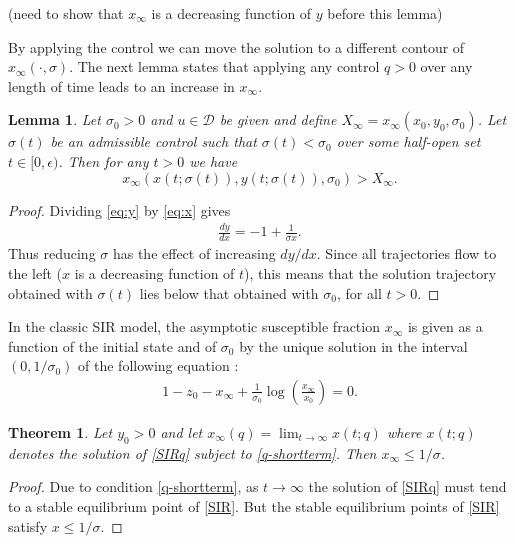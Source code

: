 \documentclass[english,12pt]{article}
\newtheorem{thm}{Theorem}
\newtheorem{lem}{Lemma}
\newtheorem{cor}{Corollary}
\newcommand{\Rnot}{\sigma_0}
\newcommand{\Sinf}{x_\infty}
\newcommand{\dom}{{\mathcal D}}
\begin{document}
(need to show that $\Sinf$ is a decreasing function of $y$ before this lemma)

By applying the control we can move the solution to a different contour of
$x_\infty(\cdot,\sigma)$.  The next lemma states that applying any control $q>0$ over
any length of time leads to an increase in $x_\infty$.
\begin{lem}
Let $\Rnot>0$ and $u\in\dom$ be given and define $X_\infty = x_\infty(x_0,y_0,\Rnot)$.
Let $\sigma(t)$ be an admissible control such that $\sigma(t)<\sigma_0$ over some
half-open set $t\in[0,\epsilon)$.  Then for any $t>0$ we have
$$
    x_\infty(x(t;\sigma(t)),y(t;\sigma(t)),\Rnot) > X_\infty.
$$
\end{lem}
\begin{proof}
    Dividing \eqref{eq:y} by \eqref{eq:x} gives
    \begin{align} \label{eq:dydx}
        \frac{dy}{dx} = -1 + \frac{1}{\sigma x}.
    \end{align}
    Thus reducing $\sigma$ has the effect of increasing $dy/dx$.
    Since all trajectories flow to the left ($x$ is a decreasing function of $t$),
    this means that the solution trajectory obtained with $\sigma(t)$ lies
    below that obtained with $\sigma_0$, for all $t>0$.
\end{proof}


In the classic SIR model, the asymptotic susceptible fraction $\Sinf$ is
given as a function of the initial state and of $\Rnot$ by the unique solution 
in the interval $(0,1/\Rnot)$ of the
following equation \cite[Eqn. (5.4)]{hethcote1989three}:
\begin{align} \label{s-infty}
    1 - z_0 - \Sinf + \frac{1}{\Rnot} \log\left(\frac{\Sinf}{x_0}\right) = 0.
\end{align}

\begin{thm}
Let $y_0>0$ and
let $\Sinf(q) = \lim_{t\to\infty} x(t;q)$ where $x(t;q)$ denotes the solution of
\eqref{SIRq} subject to \eqref{q-shortterm}.  Then $\Sinf\le 1/\sigma$.
\end{thm}
\begin{proof}
Due to condition \eqref{q-shortterm}, as $t \to \infty$ the solution of \eqref{SIRq}
must tend to a stable equilibrium point of \eqref{SIR}.  But the stable equilibrium
points of \eqref{SIR} satisfy $x \le 1/\sigma$.
\end{proof}
\end{document}
